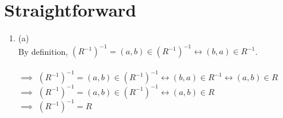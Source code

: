 \documentclass[a4paper]{article}
\begin{document}
\section{Straightforward}
\begin{enumerate}
    \item (a)\\
    By definition, $(R^{-1})^{-1} = (a, b) \in (R^{-1})^{-1} \leftrightarrow (b, a) \in R^{-1}$.\\
    \\
    $\implies$ $(R^{-1})^{-1} = (a, b) \in (R^{-1})^{-1} \leftrightarrow (b, a) \in R^{-1} \leftrightarrow (a, b) \in R$\\
    $\implies$ $(R^{-1})^{-1} = (a, b) \in (R^{-1})^{-1} \leftrightarrow (a, b) \in R$\\
    $\implies$ $(R^{-1})^{-1} = R$\\



\end{enumerate}
\end{document}
